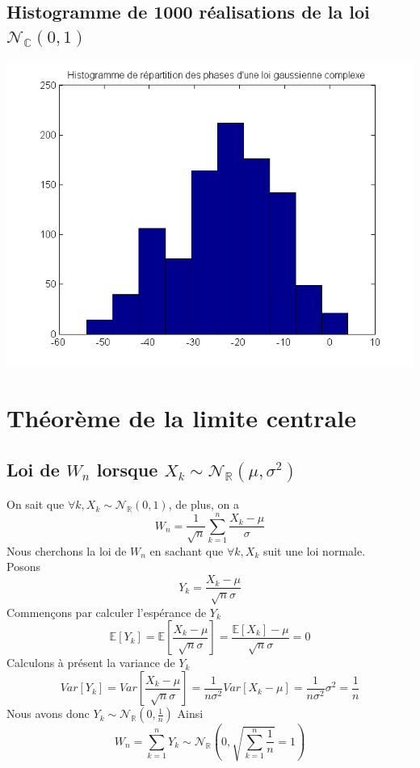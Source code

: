 \documentclass{report}
\begin{document}
		\subsection{Histogramme de 1000 réalisations de la loi $\mathcal{N}_{\mathbb{C}}(0, 1)$}
		\includegraphics[scale=0.7]{sources/Q232.png}
	\section{Théorème de la limite centrale}
		\subsection{Loi de $W_n$ lorsque $X_k \sim \mathcal{N}_{\mathbb{R}}(\mu, \sigma^2)$}
			On sait que $\forall k, X_k \sim \mathcal{N}_{\mathbb{R}}(0, 1)$, de plus, on a 
			\[ W_n = \frac{1}{\sqrt{n}} \sum\limits_{k=1}^n \frac{X_k - \mu}{\sigma} \]
			Nous cherchons la loi de $W_n$ en sachant que $\forall k, X_k$ suit une loi normale. \\
			Posons 
			\[ Y_k = \frac{X_k - \mu}{\sqrt{n}\sigma} \]
			Commençons par calculer l'espérance de $Y_k$
			\[ \mathbb{E}[Y_k] = \mathbb{E}\left[ \frac{X_k - \mu}{\sqrt{n}\sigma} \right] = \frac{\mathbb{E}[X_k] - \mu}{\sqrt{n}\sigma} = 0 \]
			Calculons à présent la variance de $Y_k$
			\[ Var[Y_k] = Var\left[ \frac{X_k - \mu}{\sqrt{n}\sigma} \right] = \frac{1}{n\sigma^2}Var[X_k-\mu] = \frac{1}{n\sigma^2}\sigma^2 = \frac{1}{n} \]
			Nous avons donc $Y_k \sim \mathcal{N}_{\mathbb{R}}(0, \frac{1}n{})$
			Ainsi
			\[ W_n = \sum\limits_{k=1}^n Y_k \sim \mathcal{N}_{\mathbb{R}}(0, \sqrt{\sum\limits_{k=1}^n\frac{1}{n}} = 1) \]
\end{document}
